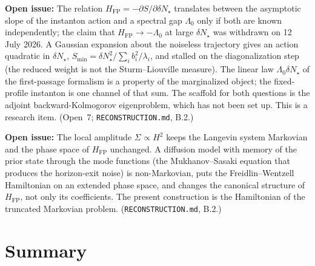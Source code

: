 \documentclass[a4paper,11pt]{article}
\newcommand{\semibold}[1]{{\fontseries{b}\selectfont{#1}}}
\newenvironment{todo}{\begin{tcolorbox}[enhanced,breakable,colback=SussexBurntOrange!10,colframe=SussexBurntOrange!40]\small{\textsf{\textbf{Open issue:} }}}{\end{tcolorbox}}
\newcommand{\dNstar}{\delta N_\star}         %
\newcommand{\Hub}{H}                         %
\newcommand{\Sigvol}[1]{\varSigma_{#1}}      %
\newcommand{\Hfp}{H_{\mathrm{FP}}}            %
\begin{document}
\begin{todo}
\semibold{The MSR--spectral bridge.} The relation
$\Hfp=-\partial S/\partial\dNstar$ translates between the asymptotic
slope of the instanton action and a spectral gap $\Lambda_0$ only if both
are known independently; the claim that $\Hfp\to-\Lambda_0$ at large
$\dNstar$ was withdrawn on 12 July 2026. A Gaussian expansion about the
noiseless trajectory gives an action quadratic in $\dNstar$,
$S_{\min}=\dNstar^2/\sum_ib_i^2/\lambda_i$, and stalled on the
diagonalization step (the reduced weight is not the Sturm--Liouville
measure). The linear law $\Lambda_0\dNstar$ of the first-passage
formalism is a property of the marginalized object; the fixed-profile
instanton is one channel of that sum. The scaffold for both questions is
the adjoint backward-Kolmogorov eigenproblem, which has not been set up.
This is a research item. (Open~7; \texttt{RECONSTRUCTION.md}, B.2.)
\end{todo}

\begin{todo}
\semibold{Non-Markovian noise.} The local amplitude $\Sigvol{}\propto\Hub^2$
keeps the Langevin system Markovian and the phase space of $\Hfp$
unchanged. A diffusion model with memory of the prior state through the
mode functions (the Mukhanov--Sasaki equation that produces the
horizon-exit noise) is non-Markovian, puts the Freidlin--Wentzell
Hamiltonian on an extended phase space, and changes the canonical
structure of $\Hfp$, not only its coefficients. The present
construction is the Hamiltonian of the truncated Markovian problem.
(\texttt{RECONSTRUCTION.md}, B.2.)
\end{todo}

\section{Summary}
\label{sec:summary}
\end{document}
